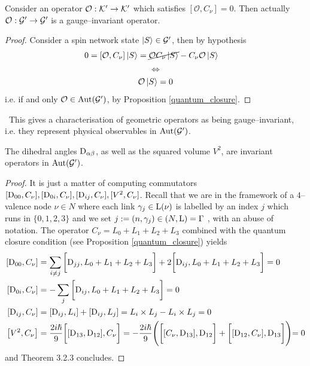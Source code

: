 \begin{teo}\label{op_gauge_invar}
    Consider an operator $\mathcal{O}:\mathcal{K}'\to\mathcal{K}'$ which satisfies $[\mathcal{O},C_\nu]=0$. Then actually $\mathcal{O}:\mathcal{G}'\to\mathcal{G}'$ is a gauge--invariant operator.
\end{teo}
\begin{proof}
    Consider a spin network state $\left| S \right >\in\mathcal{G}'$, then by hypothesis 
    \begin{align*}
        0&=[\mathcal{O},C_\nu]\left| S \right >=\cancel{\mathcal{O}C_\nu\left| S \right >}-C_\nu\mathcal{O}\left| S \right >
    \end{align*}
    $$\Leftrightarrow$$
    $$\mathcal{O}\left| S \right >=0$$
    i.e. if and only $\mathcal{O}\in\text{\normalfont Aut}(\mathcal{G}')$, by Proposition \ref{quantum_closure}.
\end{proof}
\,\newline
{This gives a characterisation of geometric operators as being gauge--invariant, i.e. they represent physical observables in $\text{\normalfont Aut}(\mathcal{G}')$.}
{
\begin{cor}
    The dihedral angles $\text{\normalfont D}_{\alpha\beta}$, as well as the squared volume $V^2$, are invariant operators in $\text{\normalfont Aut}(\mathcal{G}')$.
\end{cor}}
{\begin{proof}
It is just a matter of computing commutators $[\text{\normalfont D}_{00},C_\nu],[\text{\normalfont D}_{0i},C_\nu],[\text{\normalfont D}_{ij},C_\nu],[V^2,C_\nu]$. Recall that we are in the framework of a $4$--valence node $\nu\in N$ where each link $\gamma_j\in\text{\normalfont L}(\nu)$ is labelled by an index $j$ which runs in $\{0,1,2,3\}$ and we set $j:=(n,\gamma_j)\in(N,\text{\normalfont L})=\Gamma$ , with an abuse of notation. The operator $C_\nu=L_0+L_1+L_2+L_3$ combined with the quantum closure condition (see Proposition \ref{quantum_closure}) yields
    \begin{align*}
    \left[\Dd_{00},C_\nu\right]&=\sum_{i\neq j}\bigg[\Dd_{jj},L_0+L_1+L_2+L_3\bigg]+2\bigg[\Dd_{ij},L_0+L_1+L_2+L_3\bigg]=0\\
    [\Dd_{0i},C_\nu]&=-\sum_j\bigg[\Dd_{ij},L_0+L_1+L_2+L_3\bigg]=0\\
    [\Dd_{ij},C_\nu]&=[\Dd_{ij},L_i]+[\Dd_{ij},L_j]=L_i\times L_j-L_i\times L_j=0\\
    \left[V^2,C_\nu\right]&=\frac{2i\hslash}{9}\bigg[[\Dd_{13},\Dd_{12}],C_\nu\bigg]=-\frac{2i\hslash}{9}\Biggl(\bigg[[C_\nu,\Dd_{13}],\Dd_{12}\bigg]+\bigg[[\Dd_{12},C_\nu],\Dd_{13}\bigg]\Biggl)=0
    \end{align*}
    and Theorem 3.2.3 concludes.
\end{proof}
}
